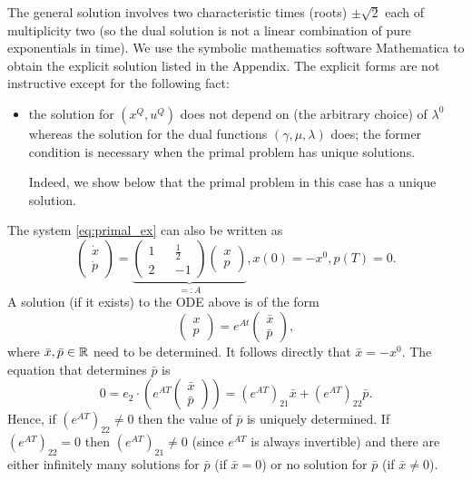 \documentclass[11pt]{article}
\begin{document}
The general solution involves two characteristic times (roots) $\pm \sqrt{2}$ each of multiplicity two (so the dual solution is not a linear combination of pure exponentials in time). We use the symbolic mathematics software {\sf Mathematica} \cite{Mathematica} to obtain the explicit solution listed in the Appendix. The explicit forms are not instructive except for the following fact:
\begin{itemize}
    \item the solution for $\left( x^Q, u^Q \right)$ does not depend on (the arbitrary choice) of $\lambda^0$ whereas the solution for the dual functions $(\gamma, \mu, \lambda)$ does; the former condition is necessary when the primal problem has unique solutions. 

    Indeed, we show below that the primal problem in this case has a unique solution.
\end{itemize}
The system \eqref{eq:primal_ex} can also be written as
\[
\begin{pmatrix} \dot{x}\\\dot{p} \end{pmatrix} = \underbrace{\begin{pmatrix} 1 && \frac12 \\ 2 && -1 \end{pmatrix} \begin{pmatrix} x \\ p \end{pmatrix}}_{=:A}, x(0) = -x^0, p(T) = 0.
\]
A solution (if it exists) to the ODE above is of the form 
\[
\begin{pmatrix}
    x \\ p
\end{pmatrix} = e^{At} \begin{pmatrix}
    \bar{x} \\ \bar{p}
\end{pmatrix},
\]
where $\bar{x}, \bar{p} \in\mathbb R$ need to be determined. It follows directly that $\bar{x} = -x^0$. The equation that determines $\bar{p}$ is
\[
0 = e_2 \cdot \left(e^{AT} \begin{pmatrix}
    \bar{x} \\ \bar{p}
\end{pmatrix} \right) = (e^{AT})_{21} \bar{x} + (e^{AT})_{22} \bar{p}.
\]
Hence, if $(e^{AT})_{22} \neq 0$ then the value of $\bar{p}$ is uniquely determined. If $(e^{AT})_{22}=0$ then $(e^{AT})_{21} \neq 0$ (since $e^{AT}$ is always invertible) and there are either infinitely many solutions for $\bar{p}$  (if $\bar{x} = 0$) or no solution for $\bar{p}$ (if $\bar{x}\neq 0$). 
\end{document}
